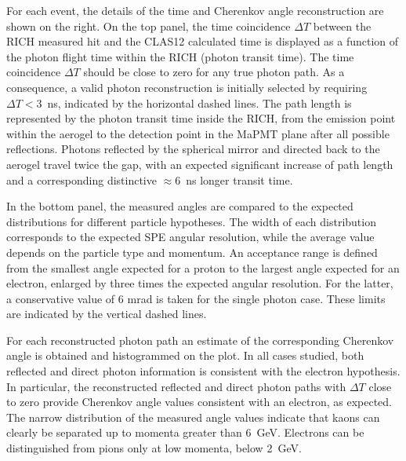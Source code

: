 \documentclass[5p,times,twocolumn]{elsarticle}
\def\dT{$\Delta T$ }
\begin{document}
For each event, the details of the time and Cherenkov angle reconstruction are shown on the right. On the top panel,
the time coincidence $\Delta T$ between the RICH measured hit and the CLAS12 calculated time is displayed as a
function of the photon flight time within the RICH (photon transit time). The time coincidence $\Delta T$ should be
close to zero for any true photon path. As a consequence, a valid photon reconstruction is initially selected by
requiring $\Delta T<3$~ns, indicated by the horizontal dashed lines. The path length is represented by the photon
transit time inside the RICH, from the emission point within the aerogel to the detection point in the MaPMT plane
after all possible reflections. Photons reflected by the spherical mirror and directed back to the aerogel travel
twice the gap, with an expected significant increase of path length and a corresponding distinctive $\approx$6~ns
longer transit time. %

In the bottom panel, the measured angles are compared to the expected distributions for different particle
hypotheses. The width of each distribution corresponds to the expected SPE angular resolution, while the average
value depends on the particle type and momentum. An acceptance range is defined from the smallest angle expected
for a proton to the largest angle expected for an electron, enlarged by three times the expected angular resolution.
For the latter, a conservative value of 6 mrad is taken for the single photon case. These limits are indicated by the
vertical dashed lines. 


For each reconstructed photon path an estimate of the corresponding Cherenkov angle is obtained and
histogrammed on the plot. In all cases studied, both reflected and direct photon information is consistent with
the electron hypothesis. In particular, the reconstructed reflected and direct photon paths with \dT close to
zero provide Cherenkov angle values consistent with an electron, as expected. The narrow distribution of the
measured angle values indicate that kaons can clearly be separated up to momenta greater than 6~GeV. Electrons
can be distinguished from pions only at low momenta, below 2~GeV.
\end{document}
